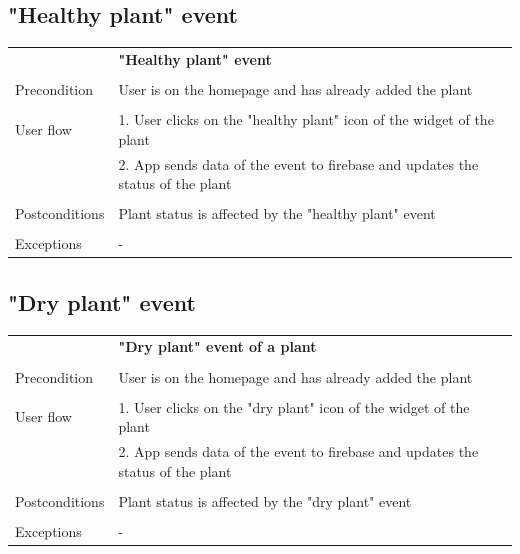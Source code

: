 \documentclass[10pt]{article}
\begin{document}
    \subsection{"Healthy plant" event}
    \begin{tabular}{ p{3cm}|p{8cm} }
     & \textbf{"Healthy plant" event} \\
     \\
     Precondition & User is on the homepage and has already added the plant \\ 
     \\
     User flow 
     & 1. User clicks on the "healthy plant" icon of the widget of the plant \\
     & 2. App sends data of the event to firebase and updates the status of the plant \\ 
     \\
     Postconditions & Plant status is affected by the "healthy plant" event \\
     \\
     Exceptions & -\\
    \end{tabular}
    \newline
    \newline
    \newline
    \subsection{"Dry plant" event}
    \begin{tabular}{ p{3cm}|p{8cm} }
     & \textbf{"Dry plant" event of a plant} \\
     \\
     Precondition & User is on the homepage and has already added the plant \\ 
     \\
     User flow 
     & 1. User clicks on the "dry plant" icon of the widget of the plant \\
     & 2. App sends data of the event to firebase and updates the status of the plant \\ 
     \\
     Postconditions & Plant status is affected by the "dry plant" event \\
     \\
     Exceptions & -\\
    \end{tabular}
    \newline
    \newline
    \newline
\end{document}
